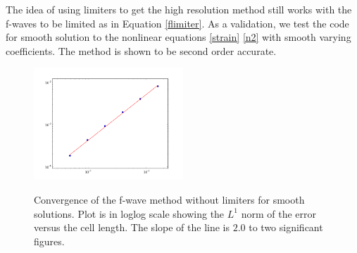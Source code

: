 \documentclass{article}
\begin{document}
\noindent The idea of using limiters to get the high resolution method still works with the f-waves to be limited as in Equation \eqref{flimiter}. As a validation, we test the code for smooth solution to the nonlinear equations \eqref{strain} \eqref{n2} with smooth varying coefficients. The method is shown to be second order accurate.
\begin{figure}
  \centering
  \includegraphics[width=0.5\textwidth]{loglog_error.png}\\
  \caption{Convergence of the f-wave method without limiters for smooth solutions. Plot is in loglog scale showing the $L^1$ norm of the error versus the cell length. The slope of the line is $2.0$ to two significant figures.}\label{convtest}
\end{figure}
\end{document}
